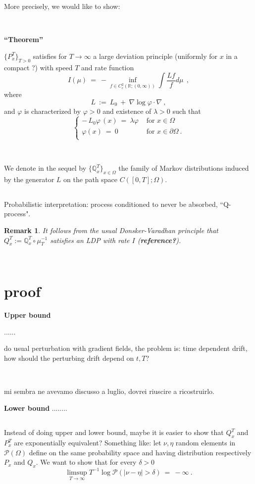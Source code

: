 \documentclass[12pt,a4paper]{article}
\newcommand{\pecetta}[1]{
$\phantom .$
\bigskip
\par\noindent
\colorbox{light}{\begin{minipage}{12.3cm}#1\end{minipage}}
\bigskip
\par\noindent
}
\newcommand{\mb}[1]{\mathbb{#1}}
\newcommand{\ms}[1]{\mathscr{#1}}
\newcommand{\mc}[1]{\mathcal{#1}}
\newcommand{\ra}{\rightarrow}
\newcommand{\vp}{\varphi}
\newtheorem{remark}[theorem]{Remark}
\begin{document}
More precisely, we would like to show:

\

{\bf ``Theorem''}


\noindent
 $\{P_{x}^T\}_{T>0}$ satisfies for $T\ra \infty $ a large deviation principle (uniformly for $x$ in a compact ?) with speed
 $T$ and rate function 
 \[   I (\mu)   \  =   \     -    \inf_{f\in C_c^2(\mb R;(0, \infty))}   \int   \frac{L  f}{f} d\mu   \    \  ,    \]
 where 
 \[    L   \  :=  \    L_0    \   +  \   \nabla  \log \vp      \cdot \nabla    \  ,    \]
 and $\vp$ is characterized by $\vp>0$ and  existence of $\lambda>0$ such that
 \[
\begin{cases} 
   - \, L_0 \vp  \,  (x)      \   =   \   \lambda \vp         & \text{ for }   x\in \Omega  \\
\vp(x)   \  =   \   0        & \text{ for }   x \in\partial \Omega     \  .     \\
\end{cases}      \]

\


\noindent
We denote in the sequel by $\{\mb Q^T_{x}\}_{x\in \Omega}$ the family of Markov distributions  
induced by the generator   $ L$ on the path space $C([0,T]; \Omega)$. 
\pecetta{Probabilistic interpretation: process conditioned to never be absorbed,  ``Q-process". }

\begin{remark}It follows from the usual Donsker-Varadhan principle that  $Q^T_{x}:= \mb Q^T_{x} \circ \mu^{-1}_T$
satisfies an LDP with rate $I$ ({\bf reference?}). 
\end{remark}



\

\section{proof}



{\bf Upper bound}

......\pecetta{do usual perturbation with gradient fields, the problem is: time dependent drift, how should the perturbing drift depend on $t, T$?

\

mi sembra ne avevamo discusso a luglio, dovrei riuscire a ricostruirlo.    }

{\bf Lower bound}
........



\pecetta{Instead of doing upper and lower bound, maybe it is easier to show that $Q^T_x$
and $P^T_x$ are exponentially equivalent? 
Something like: let  $\nu, \eta$ random elements in $\mc P(\Omega)$
define on the same probability space and
  having distribution respectively $ P_{x}$ and $Q_{x}$. 
We want to show that for every $\delta>0$
\[    \limsup_{T\ra \infty}  T^{-1} \log  \ms P(|\nu - \eta|>\delta)    \  =   \    -\infty     \   .   \]
}
 
 \begin{thebibliography}{99}



  \end{thebibliography}

 
\end{document}
